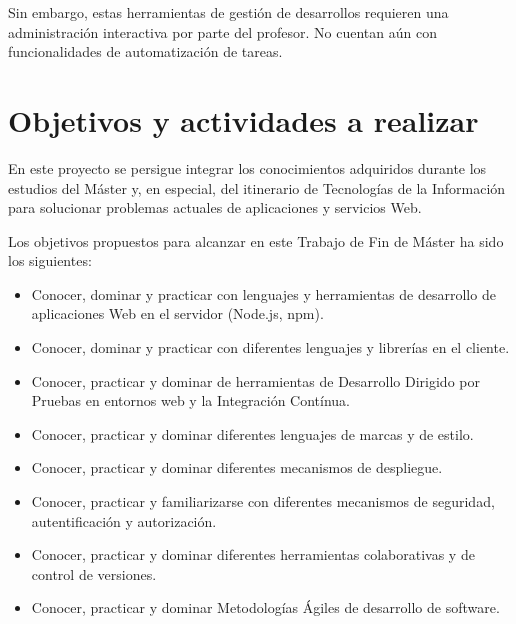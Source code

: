 Sin embargo, estas herramientas de gestión de desarrollos requieren una administración interactiva por parte del profesor. No cuentan aún con funcionalidades de automatización de tareas.

\section{Objetivos y actividades a realizar}
\label{1:sec:3}

En este proyecto se persigue integrar los conocimientos adquiridos durante los estudios del Máster y,
en especial, del itinerario de Tecnologías de la Información para solucionar problemas actuales de aplicaciones y servicios Web.

Los objetivos propuestos para alcanzar en este Trabajo de Fin de Máster ha sido los siguientes:
\begin{itemize}
  \item Conocer, dominar y practicar con lenguajes y herramientas de desarrollo de aplicaciones Web
en el servidor (Node.js, npm).
  \item Conocer, dominar y practicar con diferentes lenguajes y librerías en el cliente.
  \item Conocer, practicar y dominar de herramientas de Desarrollo Dirigido por Pruebas en entornos web y la Integración Contínua.
  \item Conocer, practicar y dominar diferentes lenguajes de marcas y de estilo.
  \item Conocer, practicar y dominar diferentes mecanismos de despliegue.
  \item Conocer, practicar y familiarizarse con diferentes mecanismos de seguridad, autentificación
y autorización.
  \item Conocer, practicar y dominar diferentes herramientas colaborativas y de control de versiones.
  \item Conocer, practicar y dominar Metodologías Ágiles de desarrollo de software.
\end{itemize}
\bigskip

